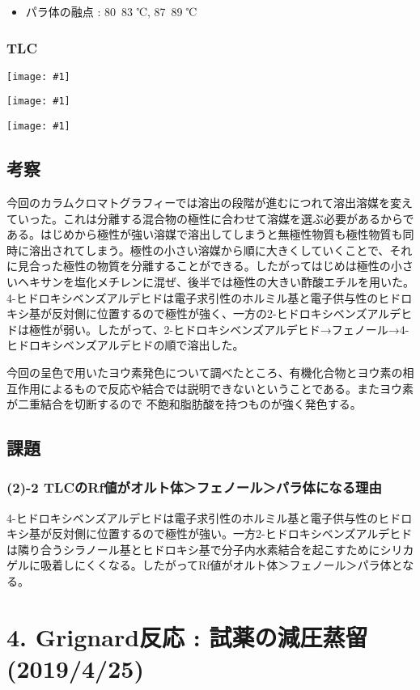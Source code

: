 \documentclass[a4paper,papersize,dvipdfmx]{jsarticle}
\newcommand{\pict}[2]{\begin{center} \texttt{[image: \#1]} \end{center}}   %
\begin{document}
\begin{itemize}
\item パラ体の融点 : 80~83 ℃, 87~89 ℃

\end{itemize}
\subsubsection*{TLC}

\pict{imgs/3-tlc1.jpeg}{6}
\pict{imgs/3-tlc2.jpeg}{6}
\pict{imgs/3-tlc3.jpeg}{6}


\subsection*{考察}
今回のカラムクロマトグラフィーでは溶出の段階が進むにつれて溶出溶媒を変えていった。これは分離する混合物の極性に合わせて溶媒を選ぶ必要があるからである。はじめから極性が強い溶媒で溶出してしまうと無極性物質も極性物質も同時に溶出されてしまう。極性の小さい溶媒から順に大きくしていくことで、それに見合った極性の物質を分離することができる。したがってはじめは極性の小さいヘキサンを塩化メチレンに混ぜ、後半では極性の大きい酢酸エチルを用いた。4-ヒドロキシベンズアルデヒドは電子求引性のホルミル基と電子供与性のヒドロキシ基が反対側に位置するので極性が強く、一方の2-ヒドロキシベンズアルデヒドは極性が弱い。したがって、2-ヒドロキシベンズアルデヒド→フェノール→4-ヒドロキシベンズアルデヒドの順で溶出した。

今回の呈色で用いたヨウ素発色について調べたところ、有機化合物とヨウ素の相互作用によるもので反応や結合では説明できないということである。またヨウ素が二重結合を切断するので 不飽和脂肪酸を持つものが強く発色する。

\subsection*{課題}
\subsubsection*{(2)-2 TLCのRf値がオルト体＞フェノール＞パラ体になる理由}
4-ヒドロキシベンズアルデヒドは電子求引性のホルミル基と電子供与性のヒドロキシ基が反対側に位置するので極性が強い。一方2-ヒドロキシベンズアルデヒドは隣り合うシラノール基とヒドロキシ基で分子内水素結合を起こすためにシリカゲルに吸着しにくくなる。したがってRf値がオルト体＞フェノール＞パラ体となる。


\section*{4. Grignard反応 : 試薬の減圧蒸留 (2019/4/25)}
\end{document}
